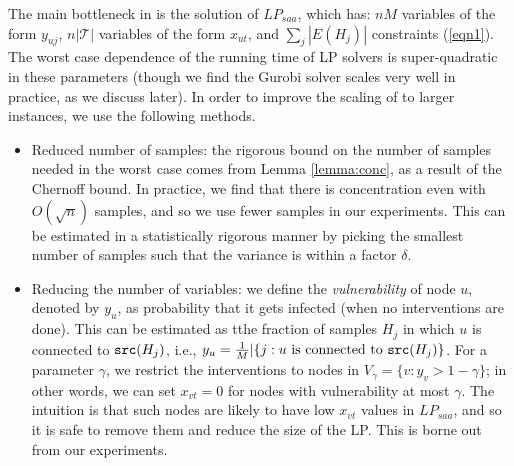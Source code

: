 The main bottleneck in \algo{} is the solution of $LP_{saa}$, which has: 
$nM$ variables of the form $y_{uj}$, $n|\mathcal{T}|$ variables of the form $x_{ut}$,
and $\sum_j |E(H_j)|$ constraints (\ref{eqn1}).
The worst case dependence of the running time of LP solvers is super-quadratic in these parameters
(though we find the Gurobi solver scales very well in practice, as we discuss later).
In order to improve the scaling of \algo{} to larger instances, we use the following methods.
\begin{itemize}
\item
Reduced number of samples: the rigorous bound on the number of samples needed in the worst case comes
from Lemma \ref{lemma:conc}, as a result of the Chernoff bound.
In practice, we find that there is concentration even with $O(\sqrt{n})$ samples, and so we
use fewer samples in our experiments. This can be estimated in a statistically rigorous manner by 
picking the smallest number of samples such that the variance is within a factor $\delta$.
\item
Reducing the number of variables: 
we define the \emph{vulnerability} of node $u$, denoted by $y_u$, as probability that it gets infected
(when no interventions are done).
This can be estimated as tthe fraction of samples $H_j$ in which $u$ is connected to $\texttt{src}(H_j)$,
i.e., $y_u=\frac{1}{M}|\{j: \mbox{$u$ is connected to $\texttt{src}(H_j)$}\}$.
For a parameter $\gamma$, we restrict the interventions to nodes in $V_{\gamma}=\{v: y_v > 1-\gamma\}$;
in other words, we can set $x_{vt}=0$ for nodes with vulnerability at most $\gamma$.
The intuition is that such nodes are likely to have low $x_{vt}$ values in $LP_{saa}$,
and so it is safe to remove them and reduce the size of the LP. This is borne out from our experiments.
\end{itemize}
